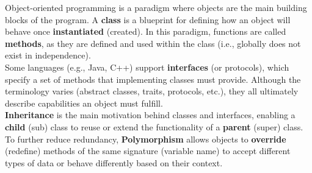 \begin{Def}

    Object-oriented programming is a paradigm where objects are the main building blocks of the program.
    A \textbf{class} is a blueprint for defining how an object will behave once \textbf{instantiated} (created). In this paradigm,
    functions are called \textbf{methods}, as they are defined and used within the class (i.e., globally does not exist in independence).\\

    \noindent
    Some languages (e.g., Java, C++) support \textbf{interfaces} (or protocols), which specify a set of methods that implementing classes must provide. Although the terminology varies 
    (abstract classes, traits, protocols, etc.), they all ultimately describe capabilities an object must fulfill.\\

    \noindent
    \textbf{Inheritance} is the main motivation behind classes and interfaces, enabling a \textbf{child} (sub) class to reuse or extend the 
    functionality of a \textbf{parent} (super) class. To further reduce redundancy, \textbf{Polymorphism} allows objects 
    to \textbf{override} (redefine) methods of the same signature (variable name) to accept different types of data or behave differently based on their context.
\end{Def}

\newpage 

